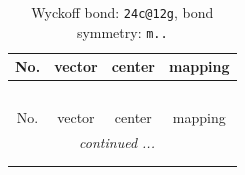 \documentclass[fleqn,8pt]{jsarticle}
\begin{document}
\renewcommand{\arraystretch}{1.2}
\begin{longtable}{cccc}
\caption{Wyckoff bond: {\tt 24c@12g}, bond symmetry: {\tt m..}}
 \\
 \hline \hline
No. & vector & center & mapping \\ \hline \endfirsthead

\multicolumn{3}{l}{\tablename\ \thetable{}} \\
 \hline \hline
No. & vector & center & mapping \\ \hline \endhead

 \hline \hline
\multicolumn{3}{r}{\footnotesize\it continued ...} \\ \endfoot

 \hline \hline
\multicolumn{3}{r}{} \\ \endlastfoot


\end{longtable}
\end{document}

